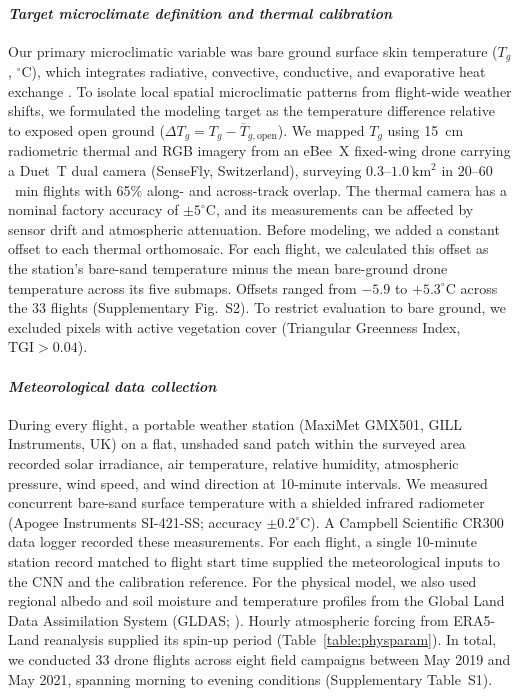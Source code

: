 \documentclass[12pt]{article}
\begin{document}
\paragraph*{\textit{Target microclimate definition and thermal calibration}}
Our primary microclimatic variable was bare ground surface skin temperature ($T_g$, $^\circ\mathrm{C}$), which integrates radiative, convective, conductive, and evaporative heat exchange \citep{campbell_1998}. To isolate local spatial microclimatic patterns from flight-wide weather shifts, we formulated the modeling target as the temperature difference relative to exposed open ground ($\Delta T_g = T_g - \overline{T}_{g,\text{open}}$). We mapped $T_g$ using 15~cm radiometric thermal and RGB imagery from an eBee~X fixed-wing drone carrying a Duet~T dual camera (SenseFly, Switzerland), surveying $0.3$--$1.0~\text{km}^2$ in $20$--$60$~min flights with 65\% along- and across-track overlap. The thermal camera has a nominal factory accuracy of $\pm 5^\circ\mathrm{C}$, and its measurements can be affected by sensor drift and atmospheric attenuation. Before modeling, we added a constant offset to each thermal orthomosaic. For each flight, we calculated this offset as the station's bare-sand temperature minus the mean bare-ground drone temperature across its five submaps. Offsets ranged from $-5.9$ to $+5.3^\circ\mathrm{C}$ across the 33 flights (Supplementary Fig.~S2). To restrict evaluation to bare ground, we excluded pixels with active vegetation cover (Triangular Greenness Index, $\text{TGI} > 0.04$).

\paragraph*{\textit{Meteorological data collection}}
During every flight, a portable weather station (MaxiMet GMX501, GILL Instruments, UK) on a flat, unshaded sand patch within the surveyed area recorded solar irradiance, air temperature, relative humidity, atmospheric pressure, wind speed, and wind direction at 10-minute intervals. We measured concurrent bare-sand surface temperature with a shielded infrared radiometer (Apogee Instruments SI-421-SS; accuracy $\pm 0.2^\circ\mathrm{C}$). A Campbell Scientific CR300 data logger recorded these measurements. For each flight, a single 10-minute station record matched to flight start time supplied the meteorological inputs to the CNN and the calibration reference. For the physical model, we also used regional albedo and soil moisture and temperature profiles from the Global Land Data Assimilation System (GLDAS; \citealt{TheGlobalLandDataAssimilationSystem}). Hourly atmospheric forcing from ERA5-Land reanalysis supplied its spin-up period \citep{munozsabater_2021} (Table~\ref{table:physparam}). In total, we conducted 33 drone flights across eight field campaigns between May 2019 and May 2021, spanning morning to evening conditions (Supplementary Table~S1).
\end{document}
